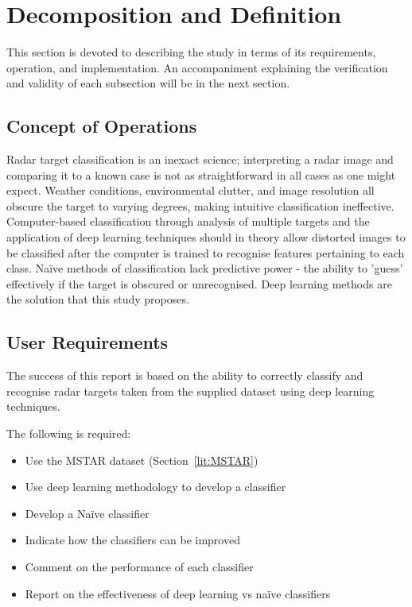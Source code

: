 \section{Decomposition and Definition}
This section is devoted to describing the study in terms of its requirements, operation, and implementation. An accompaniment explaining the verification and validity of each subsection will be in the next section.
\subsection{Concept of Operations}
Radar target classification is an inexact science; interpreting a radar image and comparing it to a known case is not as straightforward in all cases as one might expect. Weather conditions, environmental clutter, and image resolution all obscure the target to varying degrees, making intuitive classification ineffective. Computer-based classification through analysis of multiple targets and the application of deep learning techniques should in theory allow distorted images to be classified after the computer is trained to recognise features pertaining to each class. Na{\"i}ve methods of classification lack predictive power - the ability to 'guess' effectively if the target is obscured or unrecognised. Deep learning methods are the solution that this study proposes.

\subsection{User Requirements}
The success of this report is based on the ability to correctly classify and recognise radar targets taken from the supplied dataset using deep learning techniques. 

The following is required:

\begin{itemize}
	\item Use the MSTAR dataset (Section~\ref{lit:MSTAR})
	\item Use deep learning methodology to develop a classifier 
	\item Develop a Na{\"i}ve classifier
	\item Indicate how the classifiers can be improved
	\item Comment on the performance of each classifier
	\item Report on the effectiveness of deep learning vs na\"ive classifiers
\end{itemize}

